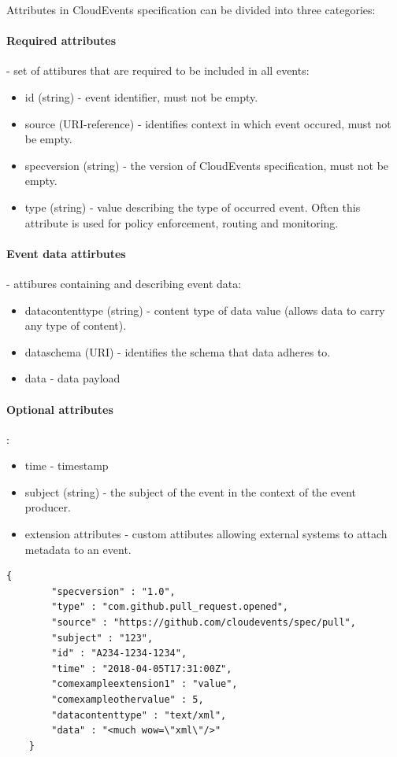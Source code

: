     Attributes in CloudEvents specification can be divided into three categories:
    \paragraph{Required attributes} - set of attibures that are required to be included in all events\cite{eventCloudEventsSpec}:
    \begin{itemize}
        \item id (string) - event identifier, must not be empty.
        \item source (URI-reference) - identifies context in which event occured, must not be empty.
        \item specversion (string) - the version of CloudEvents specification, must not be empty.
        \item type (string) - value describing the type of occurred event. Often this attribute is used for policy enforcement, routing and monitoring.
    \end{itemize}

    \paragraph{Event data attirbutes} - attibures containing and describing event data:
    \begin{itemize}
        \item datacontenttype (string) - content type of data value (allows data to carry any type of content).
        \item dataschema (URI) - identifies the schema that data adheres to.
        \item data - data payload
    \end{itemize}

    \paragraph{Optional attributes}:
    \begin{itemize}
        \item time - timestamp
        \item subject (string) - the subject of the event in the context of the event producer.
        \item extension attributes - custom attibutes allowing external systems to attach metadata to an event.
    \end{itemize}

    \begin{lstlisting}[style=jsonStyle, caption=Example of event described using CloudEvents specification in JSON format.]
    {
        "specversion" : "1.0",
        "type" : "com.github.pull_request.opened",
        "source" : "https://github.com/cloudevents/spec/pull",
        "subject" : "123",
        "id" : "A234-1234-1234",
        "time" : "2018-04-05T17:31:00Z",
        "comexampleextension1" : "value",
        "comexampleothervalue" : 5,
        "datacontenttype" : "text/xml",
        "data" : "<much wow=\"xml\"/>"
    }
    \end{lstlisting}


